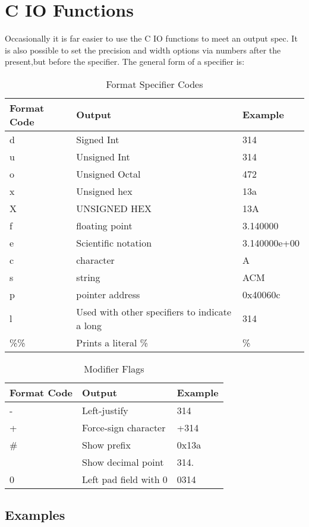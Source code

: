 \section{C IO Functions}
Occasionally it is far easier to use the C IO functions to meet an output spec. It is also possible to set the precision and width options via numbers after the present,but before the specifier.  The general form of a specifier is: 

\begin{code}
\end{code}

\begin{table}[h]
    \caption{Format Specifier Codes \cite{cplusplus}}
    \begin{tabularx}{\textwidth}{|l|X|l|} \hline
        Format Code &   Output              &   Example     \\ \hline
        d           &   Signed Int          &   314         \\
        u           &   Unsigned Int        &   314         \\
        o           &   Unsigned Octal      &   472         \\
        x           &   Unsigned hex        &   13a         \\
        X           &   UNSIGNED HEX        &   13A         \\
        f           &   floating point      &   3.140000    \\
        e           &   Scientific notation &   3.140000e+00\\
        c           &   character           &   A           \\
        s           &   string              &   ACM         \\
        p           &   pointer address     &   0x40060c    \\
        l           &   Used with other specifiers to indicate a long & 314 \\
        \%\%        &   Prints a literal \% &   \%          \\
        \hline
    \end{tabularx}
\end{table}

\begin{table}[h]
    \caption{Modifier Flags \cite{cplusplus}}
    \begin{tabularx}{\textwidth}{|l|X|l|} \hline
        Format Code &   Output                  &   Example    \\ \hline
        -           &   Left-justify            &   314        \\
        +           &   Force-sign character    &   +314       \\
        \#          &   Show prefix             &   0x13a      \\
                    &   Show decimal point      &   314.       \\
        0           &   Left pad field with 0   &   0314       \\
        \hline
    \end{tabularx}
\end{table}

\subsection{Examples}

